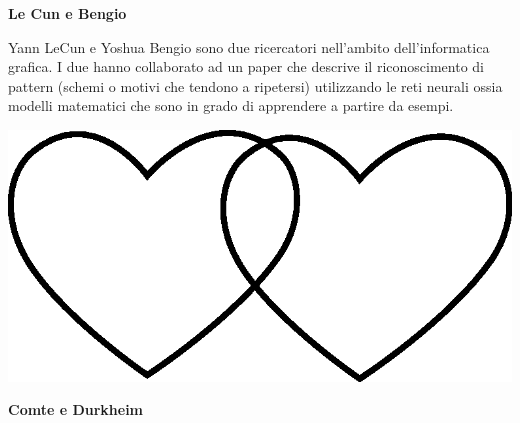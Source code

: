 \documentclass[11pt]{extarticle}
\begin{document}
\vspace*{\fill}
\newpage
\begin{center}
\vspace*{\fill}
{\Huge \textbf{Le Cun e Bengio\\}}
\vspace*{\fill}
\end{center}
\newpage
{}
\vspace*{\fill}
\begin{center}
Yann LeCun e Yoshua Bengio sono due ricercatori nell'ambito dell'informatica grafica. I due hanno collaborato ad un paper che descrive il riconoscimento di pattern (schemi o motivi che tendono a ripetersi) utilizzando le reti neurali ossia modelli matematici che sono in grado di apprendere a partire da esempi.\\
\begin{center}
\includegraphics[scale=0.1]{img/cuori_venn.eps}\\
\end{center}
\end{center}
\vspace*{\fill}
\newpage
\begin{center}
\vspace*{\fill}
{\Huge \textbf{Comte e Durkheim\\}}
\vspace*{\fill}
\end{center}
\newpage
{}
\vspace*{\fill}
\end{document}
